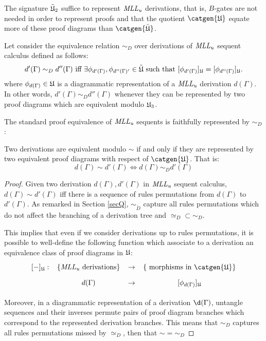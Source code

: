 \documentclass[a4paper]{article}
\begin{document}
\begin{oss}\label{sigMll}
The signature ${\tilde{\mathfrak{U}}}_2$ suffice to represent $\mathit{MLL_u}$ derivations, that is, $B$-gates are not needed in order to represent proofs and that the quotient $\catgen {\Mllc}$ equate more of these proof diagrams  than $\catgen{\Mlltc}$.
\end{oss}

Let consider the equivalence relation $\sim_D$ over derivations of $\mathit{MLL_u}$ sequent calculus defined as follows:
$$d'(\Gamma)\sim_{ D} d''(\Gamma) \mbox{ iff } \exists \phi_{d'(\Gamma)},\phi_{d''(\Gamma)'}\in {\tilde{\mathfrak{U}}} \mbox{ such that  } [\phi_{d'(\Gamma)}]_{\mathfrak{U}}=[\phi_{d''(\Gamma)}]_{\mathfrak{U}}.$$
where $\phi_{d(\Gamma)}\in \mathfrak{U}$ is a diagrammatic representation of a $\mathit{MLL_u}$ derivation $d(\Gamma)$.
In other words, $d'(\Gamma)\sim_{ D} d''(\Gamma)$ whenever they can be represented by two proof diagrams which are equivalent modulo $\mathfrak{U}_3$. 

The standard proof equivalence of $\mathit{MLL_u}$ sequents is faithfully represented by $\sim_D$:


\begin{theorem}\label{proofRep}
Two derivations are equivalent modulo $\sim$ if and only if they are represented  by two equivalent proof diagrams with respect of $\catgen{\Mllc}$. That is:
$$d(\Gamma)\sim d'(\Gamma) \Leftrightarrow  d(\Gamma)\sim_D d'(\Gamma)$$
\begin{proof}
Given two derivation $d(\Gamma),d'(\Gamma)$ in $\mathit{MLL_u}$ sequent calculus, $d(\Gamma)\sim d'(\Gamma)$ iff there is a sequence of rules permutations from $d(\Gamma)$ to $d'(\Gamma)$. As remarked in Section \ref{secQ}, $\sim_{\tilde D}$ capture all rules permutations which do not affect the branching of a derivation tree and $\simeq_D\subset \sim_D$. 

This implies that even if we consider derivations up to rules permutations, it is possible to well-define the following function which associate to a derivation an equivalence class of proof diagrams in $\mathfrak{U}$:
$$
\xymatrix@C=.5em@R=.5em{
[ - ]_{\Mllc}: &
\{ \MLLc  \mbox{ derivations} \}  &
\fr & 
\{  \mbox{ morphisms in } \catgen{\Mllc}\}
\\
~& 
d(\Gamma)  &
\fr &
[\phi_{d(\Gamma)}]_{\Mllc}
}
$$


Moreover, in a diagrammatic representation of a derivation $\d(\Gamma)$, untangle sequences and their inverses permute pairs of proof diagram branches which correspond to the represented derivation branches. This means that $\sim_D$ captures all rules permutations missed by $\simeq_D$, then that $\sim=\sim_D$
\end{proof}
\end{theorem}
\end{document}

